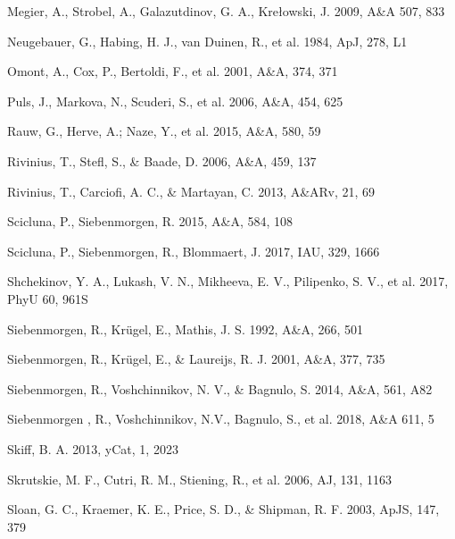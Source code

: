 \documentclass[tradiabstract]{aa} %
\begin{document}
\begin{thebibliography}{}
\item[]  Megier, A., Strobel, A., Galazutdinov, G. A., Kre{\l}owski, J. 2009, A\&A 507, 833
  
\item[] Neugebauer, G., Habing, H. J., van Duinen, R., et al. 1984, ApJ, 278,
L1

\item[] Omont, A., Cox, P., Bertoldi, F., et al. 2001, A\&A, 374, 371

\item[] Puls, J., Markova, N., Scuderi, S., et al. 2006, A\&A, 454, 625

\item[] Rauw, G., Herve, A.; Naze, Y., et al. 2015, A\&A, 580, 59

\item[] Rivinius, T., Stefl, S., \& Baade, D. 2006, A\&A, 459, 137

\item[] Rivinius, T., Carciofi, A. C., \& Martayan, C. 2013, A\&ARv, 21, 69

\item[] Scicluna, P., Siebenmorgen, R. 2015, A\&A, 584, 108

\item[] Scicluna, P., Siebenmorgen, R., Blommaert, J. 2017, IAU, 329, 1666


\item[] Shchekinov, Y. A., Lukash, V. N., Mikheeva, E. V., Pilipenko,
  S. V., et al. 2017, PhyU 60, 961S

\item[] Siebenmorgen, R., Kr\"ugel, E., Mathis, J. S. 1992, A\&A, 266, 501
  
\item[] Siebenmorgen, R., Kr\"ugel, E., \& Laureijs, R. J. 2001, A\&A, 377, 735

\item[] Siebenmorgen, R., Voshchinnikov, N. V., \& Bagnulo, S. 2014, A\&A, 561, A82

\item[] Siebenmorgen , R., Voshchinnikov, N.V., Bagnulo, S., et al. 2018, A\&A
  611, 5


\item[] Skiff, B. A. 2013, yCat, 1, 2023

\item[] Skrutskie, M. F., Cutri, R. M., Stiening, R., et al. 2006, AJ, 131, 1163

\item[] Sloan, G. C., Kraemer, K. E., Price, S. D., \& Shipman, R. F. 2003,
ApJS, 147, 379


\end{thebibliography}
\end{document}
